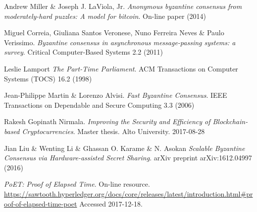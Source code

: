 \documentclass[12pt]{article}
\begin{document}
\begin{thebibliography}{9}
		Andrew Miller \& Joseph J. LaViola, Jr.
  		\textit{Anonymous byzantine consensus from moderately-hard puzzles: A model for bitcoin}.
  		On-line paper (2014)

		Miguel Correia, Giuliana Santos Veronese, Nuno Ferreira Neves \& Paulo Verissimo.
		\textit{Byzantine consensus in asynchronous message-passing systems: a survey}.
		Critical Computer-Based Systems 2.2 (2011)

		Leslie Lamport
		\textit{The Part-Time Parliament}.
		ACM Transactions on Computer Systems (TOCS) 16.2 (1998)

		Jean-Philippe Martin \& Lorenzo Alvisi.
		\textit{Fast Byzantine Consensus}.
		IEEE Transactions on Dependable and Secure Computing 3.3 (2006)

		Rakesh Gopinath Nirmala.
		\textit{Improving the Security and Efficiency of Blockchain-based Cryptocurrencies}. 
		Master thesis. Alto University. 2017-08-28

		Jian Liu \& Wenting Li \& Ghassan O. Karame \& N. Asokan
 		\textit{Scalable Byzantine Consensus via Hardware-assisted Secret Sharing}.
 		arXiv preprint arXiv:1612.04997 (2016)

		\textit{PoET: Proof of Elapsed Time}.
		On-line resource. 
		\url{https://sawtooth.hyperledger.org/docs/core/releases/latest/introduction.html#proof-of-elapsed-time-poet}
		Accessed 2017-12-18.

	\end{thebibliography}
\end{document}
